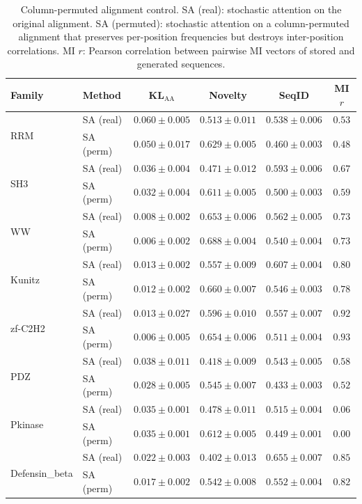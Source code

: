 \begin{table}[ht]
\centering
\caption{Column-permuted alignment control. SA (real): stochastic attention on the original alignment. SA (permuted): stochastic attention on a column-permuted alignment that preserves per-position frequencies but destroys inter-position correlations. MI $r$: Pearson correlation between pairwise MI vectors of stored and generated sequences.}
\label{tab:permuted-alignment}
\small
\begin{tabular}{@{}llcccc@{}}
\toprule
Family & Method & KL$_{\mathrm{AA}}$ & Novelty & SeqID & MI $r$ \\
\midrule
\multirow{2}{*}{RRM}
 & SA (real) & $0.060 \pm 0.005$ & $0.513 \pm 0.011$ & $0.538 \pm 0.006$ & $0.53$ \\
 & SA (perm) & $0.050 \pm 0.017$ & $0.629 \pm 0.005$ & $0.460 \pm 0.003$ & $0.48$ \\
\midrule
\multirow{2}{*}{SH3}
 & SA (real) & $0.036 \pm 0.004$ & $0.471 \pm 0.012$ & $0.593 \pm 0.006$ & $0.67$ \\
 & SA (perm) & $0.032 \pm 0.004$ & $0.611 \pm 0.005$ & $0.500 \pm 0.003$ & $0.59$ \\
\midrule
\multirow{2}{*}{WW}
 & SA (real) & $0.008 \pm 0.002$ & $0.653 \pm 0.006$ & $0.562 \pm 0.005$ & $0.73$ \\
 & SA (perm) & $0.006 \pm 0.002$ & $0.688 \pm 0.004$ & $0.540 \pm 0.004$ & $0.73$ \\
\midrule
\multirow{2}{*}{Kunitz}
 & SA (real) & $0.013 \pm 0.002$ & $0.557 \pm 0.009$ & $0.607 \pm 0.004$ & $0.80$ \\
 & SA (perm) & $0.012 \pm 0.002$ & $0.660 \pm 0.007$ & $0.546 \pm 0.003$ & $0.78$ \\
\midrule
\multirow{2}{*}{zf-C2H2}
 & SA (real) & $0.013 \pm 0.027$ & $0.596 \pm 0.010$ & $0.557 \pm 0.007$ & $0.92$ \\
 & SA (perm) & $0.006 \pm 0.005$ & $0.654 \pm 0.006$ & $0.511 \pm 0.004$ & $0.93$ \\
\midrule
\multirow{2}{*}{PDZ}
 & SA (real) & $0.038 \pm 0.011$ & $0.418 \pm 0.009$ & $0.543 \pm 0.005$ & $0.58$ \\
 & SA (perm) & $0.028 \pm 0.005$ & $0.545 \pm 0.007$ & $0.433 \pm 0.003$ & $0.52$ \\
\midrule
\multirow{2}{*}{Pkinase}
 & SA (real) & $0.035 \pm 0.001$ & $0.478 \pm 0.011$ & $0.515 \pm 0.004$ & $0.06$ \\
 & SA (perm) & $0.035 \pm 0.001$ & $0.612 \pm 0.005$ & $0.449 \pm 0.001$ & $0.00$ \\
\midrule
\multirow{2}{*}{Defensin\_beta}
 & SA (real) & $0.022 \pm 0.003$ & $0.402 \pm 0.013$ & $0.655 \pm 0.007$ & $0.85$ \\
 & SA (perm) & $0.017 \pm 0.002$ & $0.542 \pm 0.008$ & $0.552 \pm 0.004$ & $0.82$ \\
\bottomrule
\end{tabular}
\end{table}

